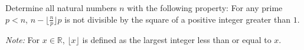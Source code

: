 Determine all natural numbers $n$ with the following property:
For any prime $p<n$, $n-\lfloor \frac{n}{p}\rfloor p$ is not divisible by the square of a positive integer greater than $1$.

\emph{Note:} For $x \in \mathbb{R}$, $\lfloor x\rfloor$ is defined as the largest integer less than or equal to $x$.
